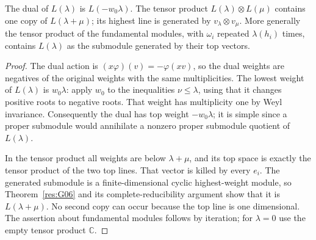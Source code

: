 \begin{proposition}
\label{res:G08}
The dual of \(L(\lambda)\) is \(L(-w_0\lambda)\).
The tensor product \(L(\lambda)\otimes L(\mu)\) contains one copy
of \(L(\lambda+\mu)\); its highest line is generated by
\(v_\lambda\otimes v_\mu\).
More generally the tensor product of the fundamental modules,
with \(\omega_i\) repeated \(\lambda(h_i)\) times, contains
\(L(\lambda)\) as the submodule generated by their top vectors.
\end{proposition}
\begin{proof}
The dual action is \((x\varphi)(v)=-\varphi(xv)\), so the
dual weights are negatives of the original weights with the same
multiplicities. The lowest weight of \(L(\lambda)\) is \(w_0\lambda\):
apply \(w_0\) to the inequalities \(\nu\leq\lambda\), using that
it changes positive roots to negative roots.
That weight has multiplicity one by Weyl invariance.
Consequently the dual has top weight \(-w_0\lambda\);
it is simple since a proper submodule would annihilate a nonzero
proper submodule quotient of \(L(\lambda)\).

In the tensor product all weights are below \(\lambda+\mu\),
and its top space is exactly the tensor product of the two top
lines. That vector is killed by every \(e_i\).
The generated submodule is a finite-dimensional cyclic highest-weight
module, so Theorem~\ref{res:G06} and its complete-reducibility
argument show that it is \(L(\lambda+\mu)\).
No second copy can occur because the top line is one dimensional.
The assertion about fundamental modules follows by iteration;
for \(\lambda=0\) use the empty tensor product \(\mathbb C\).
\end{proof}

